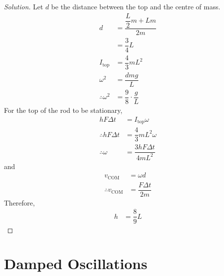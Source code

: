 \documentclass[fleqn, a4paper, 12pt]{article}
\theoremstyle{definition}
\theoremstyle{theorem}
\newenvironment{solution}
{\begin{proof}[Solution]\let\qed\relax}
	{\end{proof}}
\begin{document}
\begin{solution}
	Let $d$ be the distance between the top and the centre of mass.
	\begin{align*}
		d &= \dfrac{\dfrac{L}{2} m + L m}{2 m}\\
		&= \dfrac{3}{4} L\\
		I_{\text{top}} &= \dfrac{4}{3} m L^2\\
		\omega^2 &= \dfrac{d m g}{L}\\
		\therefore \omega^2 &= \dfrac{9}{8} \cdot \dfrac{g}{L}
	\end{align*}
	For the top of the rod to be stationary,
	\begin{align*}
		h F \Delta t &= I_{\text{top}} \omega\\
		\therefore h F \Delta t &= \dfrac{4}{3} m L^2 \omega\\
		\therefore \omega &= \dfrac{3 h F \Delta t}{4 m L^2}
	\end{align*}
	and
	\begin{align*}
		v_{\text{COM}} &= \omega d\\
		\therefore v_{\text{COM}} &= \dfrac{F \Delta t}{2 m}
	\end{align*}
	Therefore,
	\begin{align*}
		h &= \dfrac{8}{9} L
	\end{align*}
\end{solution}

\section{Damped Oscillations}
\end{document}
